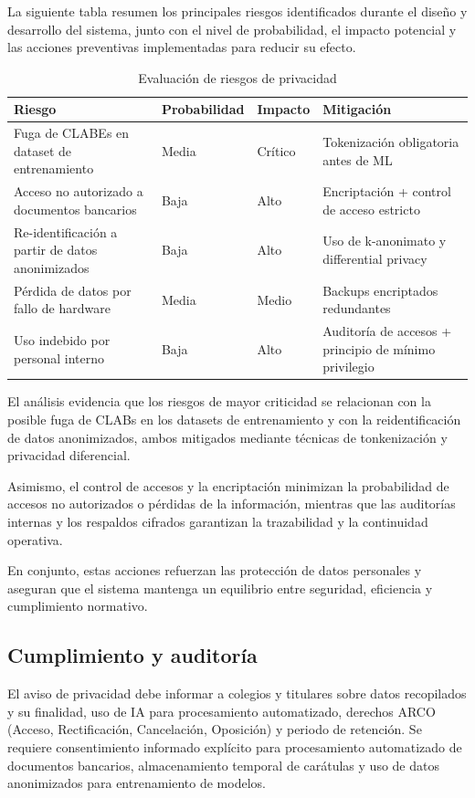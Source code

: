 La siguiente tabla resumen los principales riesgos identificados durante el diseño y desarrollo del sistema, junto con el nivel de probabilidad, el impacto potencial y las acciones preventivas implementadas para reducir su efecto.

\begin{table}[htbp]
\centering
\caption{Evaluación de riesgos de privacidad}
\label{tab:riesgos_privacidad}
\scriptsize
\begin{tabular}{|p{4cm}|l|l|p{5cm}|}
\hline
\textbf{Riesgo} & \textbf{Probabilidad} & \textbf{Impacto} & \textbf{Mitigación} \\
\hline
Fuga de CLABEs en dataset de entrenamiento & Media & Crítico & Tokenización obligatoria antes de ML \\
\hline
Acceso no autorizado a documentos bancarios & Baja & Alto & Encriptación + control de acceso estricto \\
\hline
Re-identificación a partir de datos anonimizados & Baja & Alto & Uso de k-anonimato y differential privacy \\
\hline
Pérdida de datos por fallo de hardware & Media & Medio & Backups encriptados redundantes \\
\hline
Uso indebido por personal interno & Baja & Alto & Auditoría de accesos + principio de mínimo privilegio \\
\hline
\end{tabular}
\end{table}

El análisis evidencia que los riesgos de mayor criticidad se relacionan con la posible fuga de CLABs en los datasets de entrenamiento y con la reidentificación de datos anonimizados, ambos mitigados mediante técnicas de tonkenización y privacidad diferencial.

Asimismo, el control de accesos y la encriptación minimizan la probabilidad de accesos no autorizados o pérdidas de la información, mientras que las auditorías internas y los respaldos cifrados garantizan la trazabilidad y la continuidad operativa. 

En conjunto, estas acciones refuerzan las protección de datos personales y aseguran que el sistema mantenga un equilibrio entre seguridad, eficiencia y cumplimiento normativo.


\subsection{Cumplimiento y auditoría}

El aviso de privacidad debe informar a colegios y titulares sobre datos recopilados y su finalidad, uso de IA para procesamiento automatizado, derechos ARCO (Acceso, Rectificación, Cancelación, Oposición) y periodo de retención. Se requiere consentimiento informado explícito para procesamiento automatizado de documentos bancarios, almacenamiento temporal de carátulas y uso de datos anonimizados para entrenamiento de modelos.


